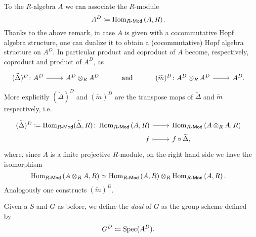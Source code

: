 \begin{rem}\label{rem:dualHopfStructure}
	To the $R$-algebra $A$ we can associate the $R$-module 
	\begin{equation*}
	A^D \coloneqq \operatorname{Hom}_{ R\text{-}\mathsf{Mod} } \left( A, R \right)
	.\end{equation*} 
	Thanks to the above remark, 
	in case $A$ is given with a cocommutative Hopf algebra structure, one
	can dualize it to obtain a (cocommutative) Hopf algebra structure on $A^D$.
	In particular product and coproduct of $A$ become, respectively,
	coproduct and product of $A^D$, as
	\begin{equation*}
	\begin{tikzcd}
		(\widetilde{\Delta})^D\colon
		A^D \arrow[r, "", rightarrow] &
		A^D \otimes_R A^D &
		\text{\text{and}} &
		(\widetilde{m})^D\colon
		A^D \otimes_R A^D \arrow[r, "", rightarrow] &
		A^D 
	.\end{tikzcd}
	\end{equation*}
	More explicitly $(\widetilde{\Delta})^D$ and $(\widetilde{m})^D$ are
	the transpose maps of $\widetilde{\Delta}$ and $\widetilde{m}$ respectively,
	i.e.
	\begin{equation*}
	\begin{tikzcd}[row sep = 0ex
		,/tikz/column 1/.append style={anchor=base east}
		,/tikz/column 2/.append style={anchor=base west}]
		(\widetilde{\Delta})^D \coloneqq \Hom_{ R\text{-}\mathsf{Mod} }
		( \widetilde{\Delta}, R )
		\colon \Hom_{ R\text{-}\mathsf{Mod} } \left( A, R \right)\arrow[r, "", rightarrow] &
		\Hom_{ R\text{-}\mathsf{Mod} } \left( A \otimes_R A, R \right)\\
		f \arrow[r, "", mapsto] & f \circ \widetilde{\Delta}
	,\end{tikzcd}
	\end{equation*} 
	where, since $A$ is a finite projective $R$-module, 
	on the right hand side we have the isomorphism
	\begin{equation*}
	\operatorname{Hom}_{ R\text{-}\mathsf{Mod} } \left( A \otimes_R A, R \right) \simeq
	\operatorname{Hom}_{ R\text{-}\mathsf{Mod} } \left( A, R \right) \otimes_R
	\operatorname{Hom}_{ R\text{-}\mathsf{Mod} } \left( A, R \right)
	.\end{equation*}
	Analogously one constructs $(\widetilde{m})^D$.
\end{rem}


\begin{defn}
	Given a $S$ and $G$ as before, we define the \emph{dual} of $G$ as the
	group scheme defined by
	\begin{equation*}
	G^D \coloneqq \operatorname{Spec}(A^D)
	.\end{equation*}
\end{defn}



